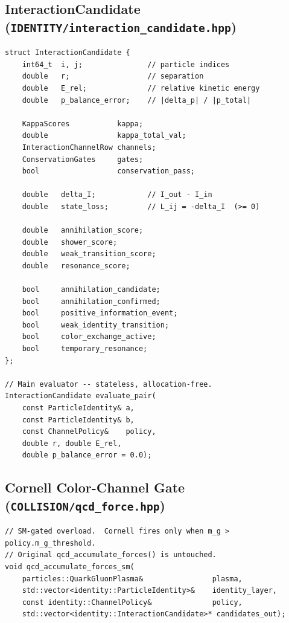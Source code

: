 \documentclass[11pt,a4paper]{article}
\theoremstyle{defbox}
\begin{document}
\subsection{InteractionCandidate (\texttt{IDENTITY/interaction\_candidate.hpp})}

\begin{lstlisting}[caption={Full pair evaluation record and evaluator.}]
struct InteractionCandidate {
	int64_t  i, j;               // particle indices
	double   r;                  // separation
	double   E_rel;              // relative kinetic energy
	double   p_balance_error;    // |delta_p| / |p_total|

	KappaScores           kappa;
	double                kappa_total_val;
	InteractionChannelRow channels;
	ConservationGates     gates;
	bool                  conservation_pass;

	double   delta_I;            // I_out - I_in
	double   state_loss;         // L_ij = -delta_I  (>= 0)

	double   annihilation_score;
	double   shower_score;
	double   weak_transition_score;
	double   resonance_score;

	bool     annihilation_candidate;
	bool     annihilation_confirmed;
	bool     positive_information_event;
	bool     weak_identity_transition;
	bool     color_exchange_active;
	bool     temporary_resonance;
};

// Main evaluator -- stateless, allocation-free.
InteractionCandidate evaluate_pair(
	const ParticleIdentity& a,
	const ParticleIdentity& b,
	const ChannelPolicy&    policy,
	double r, double E_rel,
	double p_balance_error = 0.0);
\end{lstlisting}

\subsection{Cornell Color-Channel Gate (\texttt{COLLISION/qcd\_force.hpp})}

\begin{lstlisting}[caption={\texttt{qcd\_accumulate\_forces\_sm()} -- SM-gated force pass.}]
// SM-gated overload.  Cornell fires only when m_g > policy.m_g_threshold.
// Original qcd_accumulate_forces() is untouched.
void qcd_accumulate_forces_sm(
	particles::QuarkGluonPlasma&                plasma,
	std::vector<identity::ParticleIdentity>&    identity_layer,
	const identity::ChannelPolicy&              policy,
	std::vector<identity::InteractionCandidate>* candidates_out);
\end{lstlisting}
\end{document}
